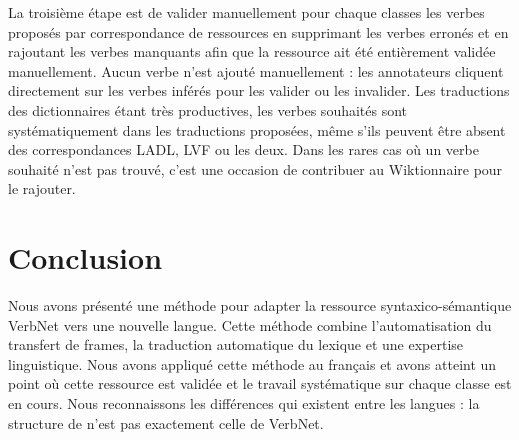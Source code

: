 La troisième étape  est de valider manuellement pour chaque classes les verbes
proposés par correspondance de ressources en supprimant les verbes erronés et
en rajoutant les verbes manquants afin que la ressource ait été entièrement
validée manuellement. Aucun verbe n'est ajouté manuellement : les annotateurs
cliquent directement sur les verbes inférés pour les valider ou les invalider.
Les traductions des dictionnaires étant très productives, les verbes souhaités
sont systématiquement dans les traductions proposées, même s'ils peuvent être
absent des correspondances LADL, LVF ou les deux. Dans les rares cas où un
verbe souhaité n'est pas trouvé, c'est une occasion de contribuer au
Wiktionnaire pour le rajouter.

\section{Conclusion}

Nous avons présenté une méthode pour adapter la ressource syntaxico-sémantique
VerbNet vers une nouvelle langue. Cette méthode combine l'automatisation du
transfert de frames, la traduction automatique du lexique et une expertise
linguistique. Nous avons appliqué cette méthode au français et avons atteint un
point où cette ressource est validée et le travail systématique sur chaque
classe est en cours. Nous reconnaissons les différences qui existent entre les
langues : la structure de \verbenet{} n'est pas exactement celle de VerbNet.

